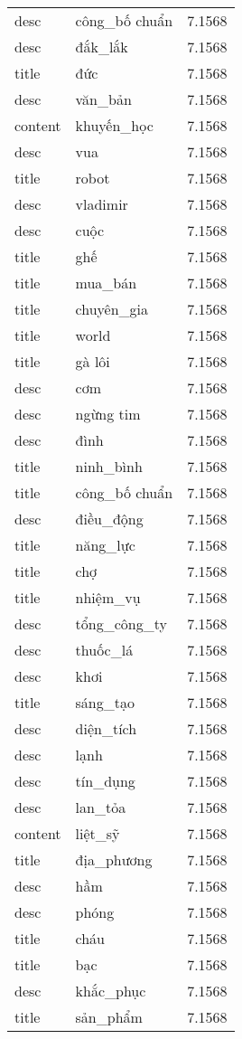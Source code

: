 \documentclass{article}
\begin{document}
\begin{tabular}{lll}
desc & công\_bố chuẩn & 7.1568\\
desc & đắk\_lắk & 7.1568\\
title & đức & 7.1568\\
desc & văn\_bản & 7.1568\\
content & khuyến\_học & 7.1568\\
desc & vua & 7.1568\\
title & robot & 7.1568\\
desc & vladimir & 7.1568\\
desc & cuộc & 7.1568\\
title & ghế & 7.1568\\
title & mua\_bán & 7.1568\\
title & chuyên\_gia & 7.1568\\
title & world & 7.1568\\
title & gà lôi & 7.1568\\
desc & cơm & 7.1568\\
desc & ngừng tim & 7.1568\\
desc & đình & 7.1568\\
title & ninh\_bình & 7.1568\\
title & công\_bố chuẩn & 7.1568\\
desc & điều\_động & 7.1568\\
title & năng\_lực & 7.1568\\
title & chợ & 7.1568\\
title & nhiệm\_vụ & 7.1568\\
desc & tổng\_công\_ty & 7.1568\\
desc & thuốc\_lá & 7.1568\\
desc & khơi & 7.1568\\
title & sáng\_tạo & 7.1568\\
desc & diện\_tích & 7.1568\\
desc & lạnh & 7.1568\\
desc & tín\_dụng & 7.1568\\
desc & lan\_tỏa & 7.1568\\
content & liệt\_sỹ & 7.1568\\
title & địa\_phương & 7.1568\\
desc & hầm & 7.1568\\
desc & phóng & 7.1568\\
title & cháu & 7.1568\\
title & bạc & 7.1568\\
desc & khắc\_phục & 7.1568\\
title & sản\_phẩm & 7.1568\\

\end{tabular}
\end{document}
